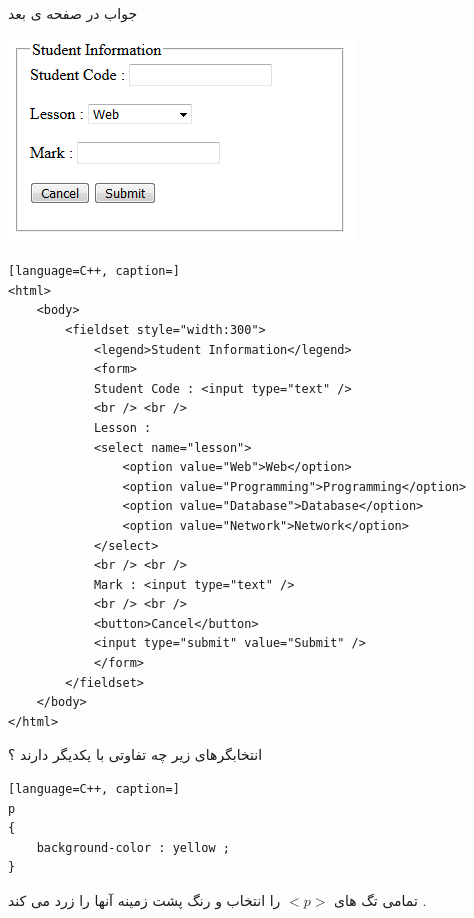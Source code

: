 \documentclass[12pt]{article}
\begin{document}
 \vspace{20pt}
 
\noindent
 جواب در صفحه ی بعد
 
\newpage
 
\begin{LTR}
	\includegraphics[scale=0.8]{./form.png}
\end{LTR}
 
 
 \begin{latin}
\begin{lstlisting}[language=C++, caption=]
<html>
	<body>
		<fieldset style="width:300">
			<legend>Student Information</legend>
			<form>
			Student Code : <input type="text" /> 
			<br /> <br />
			Lesson : 
			<select name="lesson">
				<option value="Web">Web</option>
				<option value="Programming">Programming</option>
				<option value="Database">Database</option>
				<option value="Network">Network</option>
			</select>
			<br /> <br />
			Mark : <input type="text" /> 
			<br /> <br />
			<button>Cancel</button>
			<input type="submit" value="Submit" />
			</form>
		</fieldset>
	</body>
</html>
\end{lstlisting}
\end{latin}

 


\newpage
 
 

 
\noindent
 انتخابگرهای زیر چه تفاوتی با یکدیگر دارند ؟
 
\vspace{20pt}
 
\begin{latin}
\begin{lstlisting}[language=C++, caption=]
p 
{
	background-color : yellow ;
}
\end{lstlisting}
\end{latin}



تمامی تگ های 
$<p>$
را انتخاب و رنگ پشت زمینه آنها را زرد می کند .
\end{document}
